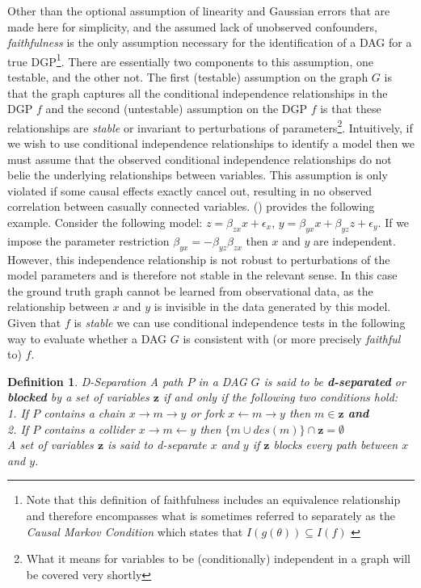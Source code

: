 \documentclass{article}
\newtheorem{definition}{Definition}
\begin{document}
Other than the optional assumption of linearity and Gaussian errors that are made here for simplicity, and the assumed lack of unobserved confounders, \textit{faithfulness} is the only assumption necessary for the identification of a DAG for a true DGP\footnote{Note that this definition of faithfulness includes an equivalence relationship and therefore encompasses what is sometimes  referred to separately as the \textit{Causal Markov Condition} which states that $I(g(\theta)) \subseteq I(f)$ \parencite{spirtes2016causal}}. There are essentially two components to this assumption, one testable, and the other not. The first (testable) assumption on the graph $G$ is that the graph captures all the conditional independence relationships in the DGP $f$ and the second (untestable) assumption on the DGP $f$ is that these relationships are \textit{stable} or invariant to perturbations of parameters\footnote{What it means for variables to be (conditionally) independent in a graph will be covered very shortly}. Intuitively, if we wish to use conditional independence relationships to identify a model then we must assume that the observed conditional independence relationships do not belie the underlying relationships between variables. This assumption is only violated if some causal effects exactly cancel out, resulting in no observed correlation between casually connected variables. \citeauthor{pearl2009causality} (\citeyear{pearl2009causality}) provides the following example. Consider the following model: $z = \beta_{zx} x + \epsilon_x$, $ y = \beta_{yx} x + \beta_{yz} z + \epsilon_y$. If we impose the parameter restriction $\beta_{yx} = -\beta_{yz}\beta_{zx}$ then $x$ and $y$ are independent. However, this independence relationship is not robust to perturbations of the model parameters and is therefore not stable in the relevant sense. In this case the ground truth graph cannot be learned from observational data, as the relationship between $x$ and $y$ is invisible in the data generated by this model. Given that $f$ is \textit{stable} we can use conditional independence tests in the following way to evaluate whether a DAG $G$ is consistent with (or more precisely \textit{faithful} to) $f$.

\begin{definition}{D-Separation}
  A path $P$ in a DAG $G$ is said to be \textbf{d-separated} or \textbf{blocked} by a set of variables $\mathbf{z}$ if and only if the following two conditions hold: \\
  1. If $P$ contains a chain $x \rightarrow m \rightarrow y$ or fork $x \leftarrow m \rightarrow y$ then $m \in \mathbf{z}$ \textbf{and} \\
  2. If $P$ contains a collider $x \rightarrow m \leftarrow y$ then $\{m \cup des(m)\} \cap \mathbf{z} = \emptyset$ \\
  A set of variables $\mathbf{z}$ is said to \textit{d-separate} $x$ and $y$ if $\mathbf{z}$ blocks every path between $x$ and $y$.
  \parencite[p.16]{pearl2009causality}
  \label{dseparation}
\end{definition}
\end{document}
